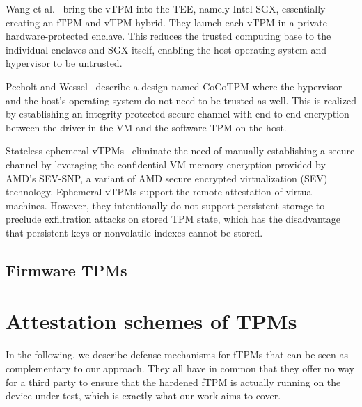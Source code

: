 Wang et al.~\cite{Wang2019} bring the vTPM into the \ac{TEE}, namely Intel SGX, essentially creating an fTPM and vTPM hybrid.
They launch each vTPM in a private hardware-protected enclave.
This reduces the trusted computing base to the individual enclaves and SGX itself, enabling the host operating system and hypervisor to be untrusted.

Pecholt and Wessel~\cite{Pecholt2022} describe a design named CoCoTPM where the hypervisor and the host's operating system do not need to be trusted as well.
This is realized by establishing an integrity-protected secure channel with end-to-end encryption between the driver in the VM and the software TPM on the host.

Stateless ephemeral vTPMs~\cite{Narayanan2023} eliminate the need of manually establishing a secure channel by leveraging the confidential VM memory encryption provided by AMD's SEV-SNP, a variant of AMD secure encrypted virtualization (SEV) technology.
Ephemeral vTPMs support the remote attestation of virtual machines.
However, they intentionally do not support persistent storage to preclude exfiltration attacks on stored TPM state, which has the disadvantage that persistent keys or nonvolatile indexes cannot be stored.

\subsection{Firmware TPMs}


\section{Attestation schemes of TPMs}



In the following, we describe defense mechanisms for fTPMs that can be seen as complementary to our approach.
They all have in common that they offer no way for a third party to ensure that the hardened fTPM is actually running on the device under test, which is exactly what our work aims to cover.

